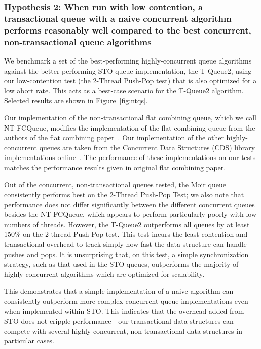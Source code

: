 \subsubsection{Hypothesis 2: When run with low contention, a transactional queue with a naive concurrent algorithm performs reasonably well compared to the best concurrent, non-transactional queue algorithms}

We benchmark a set of the best-performing highly-concurrent queue algorithms against the better performing STO queue implementation, the T-Queue2, using our low-contention test (the 2-Thread Push-Pop test) that is also optimized for a low abort rate. This acts as a best-case scenario for the T-Queue2 algorithm. Selected results are shown in Figure~\ref{fig:ntqs}.

Our implementation of the non-transactional flat combining queue, which we call NT-FCQueue, modifies the implementation of the flat combining queue from the authors of the flat combining paper~\cite{flatcombining}. Our implementation of the other highly-concurrent queues are taken from the Concurrent Data Structures (CDS) library implementations online~\cite{libcds}. The performance of these implementations on our tests matches the performance results given in original flat combining paper. 

Out of the concurrent, non-transactional queues tested, the Moir queue~\cite{queue2} consistently performs best on the 2-Thread Push-Pop Test; we also note that performance does not differ significantly between the different concurrent queues besides the NT-FCQueue, which appears to perform particularly poorly with low numbers of threads. However, the T-Queue2 outperforms all queues by at least 150\% on the 2-thread Push-Pop test. This test incurs the least contention and transactional overhead to track simply how fast the data structure can handle pushes and pops. It is unsurprising that, on this test, a simple synchronization strategy, such as that used in the STO queues, outperforms the majority of highly-concurrent algorithms which are optimized for scalability. 

This demonstrates that a simple implementation of a naive algorithm can consistently outperform more complex concurrent queue implementations even when implemented within STO. This indicates that the overhead added from STO does not cripple performance---our transactional data structures can compete with several highly-concurrent, non-transactional data structures in particular cases. 

